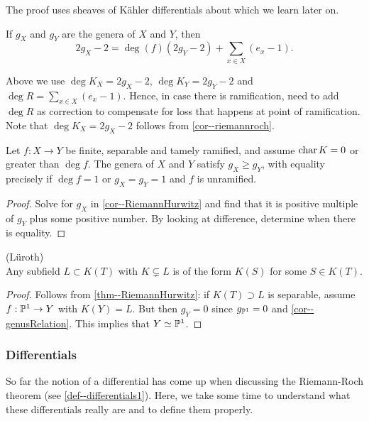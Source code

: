 \documentclass[a4paper,11pt]{article}
\begin{document}
			The proof uses sheaves of K{\"a}hler differentials about which we learn later on.

			\begin{cor}\label{cor--RiemannHurwitz}
				If $g_X$ and $g_Y$ are the genera of $X$ and $Y$, then
				\begin{equation*}
					2g_X-2=\deg (f)(2g_Y-2)+\sum_{x\in X}(e_x-1).
				\end{equation*}
			\end{cor}

			\noindent Above we use $\deg K_X=2g_X-2$, $\deg K_Y=2g_Y-2$ and $\deg R=\sum_{x\in X}(e_x-1)$. Hence, in case there is ramification, need to add $\deg R$ as correction to compensate for loss that happens at point of ramification. Note that $\deg K_X=2g_X-2$ follows from \autoref{cor--riemannroch}.
			
			\begin{cor}\label{cor--genusRelation}
				Let $f:X\rightarrow Y$ be finite, separable and tamely ramified, and assume $\Char K=0$ or greater than $\deg f$. The genera of $X$ and $Y$ satisfy $g_X\ge g_Y$, with equality precisely if $\deg f=1$ or $g_X=g_Y=1$ and $f$ is unramified.
			\end{cor}
			\begin{proof}\renewcommand{\qedsymbol}{}
				Solve for $g_X$ in \autoref{cor--RiemannHurwitz} and find that it is positive multiple of $g_Y$ plus some positive number. By looking at difference, determine when there is equality.
			\end{proof}\renewcommand{\qedsymbol}{$\square$}

			\begin{thm}
				(L{\"u}roth)\\ Any subfield $L\subset K(T)$ with $K\subsetneq L$ is of the form $K(S)$ for some $S\in K(T)$.
			\end{thm}
			\begin{proof}
				Follows from \autoref{thm--RiemannHurwitz}: if $K(T)\supset L$ is separable, assume $f:\P^1\rightarrow Y$ with $K(Y)=L$. But then $g_Y=0$ since $g_{\P^1}=0$ and \autoref{cor--genusRelation}. This implies that $Y\simeq\P^1$. 
			\end{proof}

			
			\subsubsection*{Differentials}

				So far the notion of a differential has come up when discussing the Riemann-Roch theorem (see \autoref{def--differentials1}). Here, we take some time to understand what these differentials really are and to define them properly.
				\\
\end{document}
